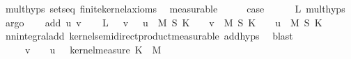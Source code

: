 \begin{isabellebody}
\ mult{\isachardot}{\kern0pt}hyps{\isacharparenleft}{\kern0pt}{}{\isacharparenright}{\kern0pt}\ sets{\isacharunderscore}{\kern0pt}eq\ finite{\isacharunderscore}{\kern0pt}kernel{\isacharunderscore}{\kern0pt}axioms\ \isamarkupfalse%
\ measurable\isanewline
\ \ \isamarkupfalse%
\ \isamarkupfalse%
\ {\isacharquery}{\kern0pt}case\isanewline
\ \ \ \ \isamarkupfalse%
\ L\ mult{\isachardot}{\kern0pt}hyps{\isacharparenleft}{\kern0pt}{}{\isacharparenright}{\kern0pt}\ \isamarkupfalse%
\ argo\isanewline
{}\isamarkupfalse%
\isanewline
\ \ \isamarkupfalse%
\ {\isacharparenleft}{\kern0pt}add\ u\ v{\isacharparenright}{\kern0pt}\isanewline
\ \ \isamarkupfalse%
\ L{\isacharcolon}{\kern0pt}\ {\isachardoublequoteopen}{\isacharparenleft}{\kern0pt}{\isasymintegral}\isactrlsup {\isacharplus}{\kern0pt}\ {\isasymomega}{\isachardot}{\kern0pt}\ v\ {\isasymomega}\ {\isacharplus}{\kern0pt}\ u\ {\isasymomega}\ {\isasympartial}{\isacharparenleft}{\kern0pt}M\ {\isasymOtimes}\isactrlsub S\ K{\isacharparenright}{\kern0pt}{\isacharparenright}{\kern0pt}\ {\isacharequal}{\kern0pt}\ {\isacharparenleft}{\kern0pt}{\isasymintegral}\isactrlsup {\isacharplus}{\kern0pt}\ {\isasymomega}{\isachardot}{\kern0pt}\ v\ {\isasymomega}\ {\isasympartial}{\isacharparenleft}{\kern0pt}M\ {\isasymOtimes}\isactrlsub S\ K{\isacharparenright}{\kern0pt}{\isacharparenright}{\kern0pt}\ {\isacharplus}{\kern0pt}\ {\isacharparenleft}{\kern0pt}{\isasymintegral}\isactrlsup {\isacharplus}{\kern0pt}\ {\isasymomega}{\isachardot}{\kern0pt}\ u\ {\isasymomega}\ {\isasympartial}{\isacharparenleft}{\kern0pt}M\ {\isasymOtimes}\isactrlsub S\ K{\isacharparenright}{\kern0pt}{\isacharparenright}{\kern0pt}{\isachardoublequoteclose}\isanewline
\ \ \ \ \isamarkupfalse%
\ nn{\isacharunderscore}{\kern0pt}integral{\isacharunderscore}{\kern0pt}add\ kernel{\isacharunderscore}{\kern0pt}semidirect{\isacharunderscore}{\kern0pt}product{\isacharunderscore}{\kern0pt}measurable\ add{\isachardot}{\kern0pt}hyps{\isacharparenleft}{\kern0pt}{}{\isacharcomma}{\kern0pt}{}{\isacharparenright}{\kern0pt}\ \isamarkupfalse%
\ blast\isanewline
\ \ \isamarkupfalse%
\ {\isachardoublequoteopen}{\isacharparenleft}{\kern0pt}{\isasymintegral}\isactrlsup {\isacharplus}{\kern0pt}\ {\isasymomega}\ {\isasymintegral}\isactrlsup {\isacharplus}{\kern0pt}\ {\isasymomega}\ v\ {\isacharparenleft}{\kern0pt}{\isasymomega}\ {\isasymomega}\ {\isacharplus}{\kern0pt}\ u\ {\isacharparenleft}{\kern0pt}{\isasymomega}\ {\isasymomega}\ {\isasympartial}kernel{\isacharunderscore}{\kern0pt}measure\ K\ {\isasymomega}\ {\isasympartial}M{\isacharparenright}{\kern0pt}\ {\isacharequal}{\kern0pt}\isanewline

\end{isabellebody}
